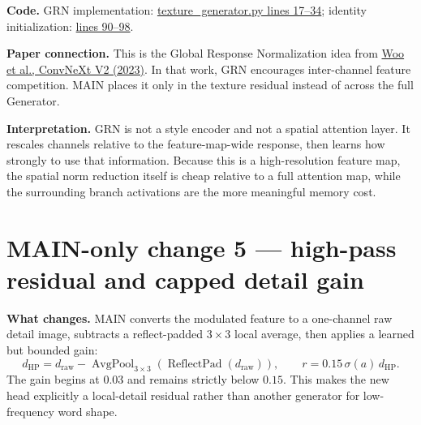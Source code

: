 \documentclass[10pt,a4paper]{article}
\newcommand{\paper}[2]{\href{#1}{#2}}
\begin{document}
\textbf{Code.}  GRN implementation: \href{https://github.com/rquq/HGGAN_test/blob/main/networks/texture_generator.py\#L17-L34}{texture\_generator.py lines 17--34}; identity initialization: \href{https://github.com/rquq/HGGAN_test/blob/main/networks/texture_generator.py\#L90-L98}{lines 90--98}.

\textbf{Paper connection.}  This is the Global Response Normalization idea from \paper{https://arxiv.org/abs/2301.00808}{Woo et al., ConvNeXt V2 (2023)}.  In that work, GRN encourages inter-channel feature competition.  MAIN places it only in the texture residual instead of across the full Generator.

\begin{center}
\end{center}

\textbf{Interpretation.}  GRN is not a style encoder and not a spatial attention layer.  It rescales channels relative to the feature-map-wide response, then learns how strongly to use that information.  Because this is a high-resolution feature map, the spatial norm reduction itself is cheap relative to a full attention map, while the surrounding branch activations are the more meaningful memory cost.

\section{MAIN-only change 5 --- high-pass residual and capped detail gain}

\textbf{What changes.}  MAIN converts the modulated feature to a one-channel raw detail image, subtracts a reflect-padded $3\times3$ local average, then applies a learned but bounded gain:
\[
 d_{\mathrm{HP}}=d_{\mathrm{raw}}-\operatorname{AvgPool}_{3\times3}\!\left(\operatorname{ReflectPad}(d_{\mathrm{raw}})\right),\qquad
 r=0.15\,\sigma(a)\,d_{\mathrm{HP}}.
\]
The gain begins at $0.03$ and remains strictly below $0.15$.  This makes the new head explicitly a local-detail residual rather than another generator for low-frequency word shape.
\end{document}
